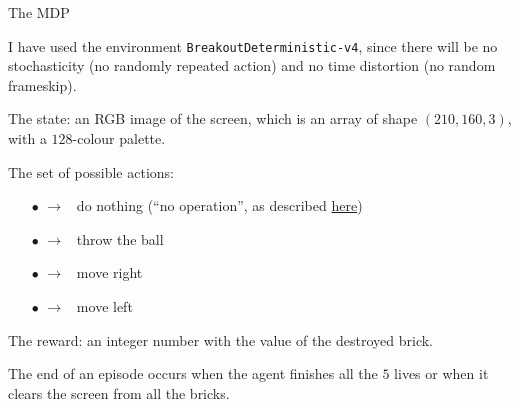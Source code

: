 \documentclass[10pt, aspectratio=169, compress, protectframetitle, handout]{beamer}
\begin{document}
\begin{frame}{The MDP}

    I have used the environment \texttt{BreakoutDeterministic-v4}, since there will be no stochasticity (no randomly repeated action) and no time distortion (no random frameskip).
    \smallskip

    The \alert{state}: an RGB image of the screen, which is an array of shape $(210, 160, 3)$, with a $128$-colour palette.
    \smallskip
    
    The set of possible \alert{actions}:
    \begin{itemize}
        \item[\alert{$\bullet$}] { $\longrightarrow$ \, do nothing (``no operation'', as described \href{https://en.wikipedia.org/wiki/NOP_(code)}{here})}
        \item[\alert{$\bullet$}] {  $\longrightarrow$ \, throw the ball}
        \item[\alert{$\bullet$}] { $\longrightarrow$ \, move right}
        \item[\alert{$\bullet$}] {  $\longrightarrow$ \, move left}
    \end{itemize}
    
    The \alert{reward}: an integer number with the value of the destroyed brick.
    \smallskip
    
    The \alert{end of an episode} occurs when the agent finishes all the $5$ lives or when it clears the screen from all the bricks.

\end{frame}
\end{document}

